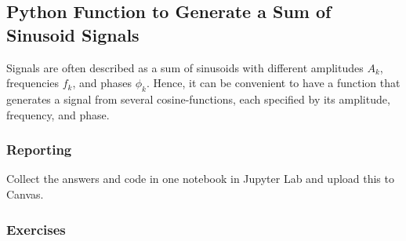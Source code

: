\subsection{Python Function to Generate a Sum of Sinusoid Signals}
Signals are often described as a sum of sinusoids with different amplitudes $A_k$, frequencies $f_k$, and phases $\phi_k$.
Hence, it can be convenient to have a function that generates a signal from several cosine-functions, each specified by its amplitude, frequency, and phase.

\subsubsection*{Reporting}	
Collect the answers and code in one notebook in Jupyter Lab and upload this to Canvas.

\subsubsection*{Exercises}	

